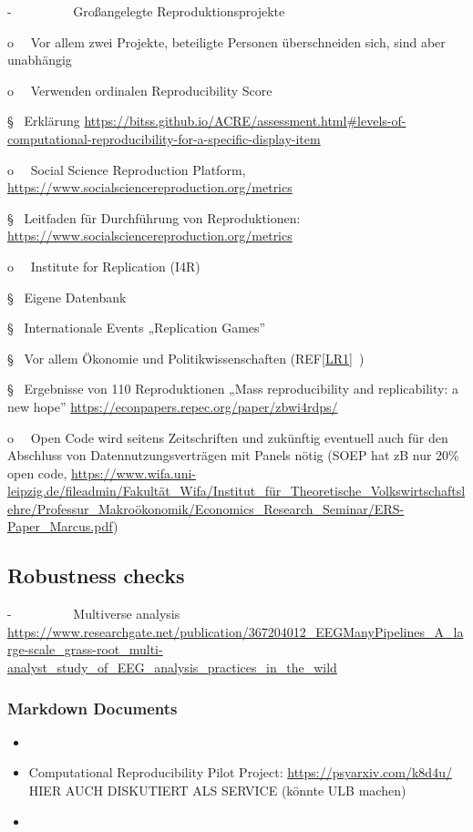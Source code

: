 \documentclass[
  letterpaper,
  DIV=11,
  numbers=noendperiod]{scrreprt}
\begin{document}
-~~~~~~~~~ Großangelegte Reproduktionsprojekte

o~~ Vor allem zwei Projekte, beteiligte Personen überschneiden sich,
sind aber unabhängig

o~~ Verwenden ordinalen Reproducibility Score

§~ Erklärung
\url{https://bitss.github.io/ACRE/assessment.html\#levels-of-computational-reproducibility-for-a-specific-display-item}

o~~ Social Science Reproduction Platform,
\url{https://www.socialsciencereproduction.org/metrics}

§~ Leitfaden für Durchführung von Reproduktionen:
\url{https://www.socialsciencereproduction.org/metrics}

o~~ Institute for Replication (I4R)

§~ Eigene Datenbank

§~ Internationale Events „Replication Games''

§~ Vor allem Ökonomie und Politikwissenschaften
(REF\hyperref[_msocom_1]{{[}LR1{]}}~)

§~ Ergebnisse von 110 Reproduktionen „Mass reproducibility and
replicability: a new hope''
\url{https://econpapers.repec.org/paper/zbwi4rdps/}

o~~ Open Code wird seitens Zeitschriften und zukünftig eventuell auch
für den Abschluss von Datennutzungsverträgen mit Panels nötig (SOEP hat
zB nur 20\% open code,
\url{https://www.wifa.uni-leipzig.de/fileadmin/Fakultät_Wifa/Institut_für_Theoretische_Volkswirtschaftslehre/Professur_Makroökonomik/Economics_Research_Seminar/ERS-Paper_Marcus.pdf})

\subsection{Robustness checks}\label{robustness-checks}

-~~~~~~~~~ Multiverse analysis
\url{https://www.researchgate.net/publication/367204012_EEGManyPipelines_A_large-scale_grass-root_multi-analyst_study_of_EEG_analysis_practices_in_the_wild}

\subsubsection{Markdown Documents}\label{markdown-documents}

\begin{itemize}
\item
\item
  Computational Reproducibility Pilot Project:
  \url{https://psyarxiv.com/k8d4u/} \textbar{} HIER AUCH DISKUTIERT ALS
  SERVICE (könnte ULB machen)
\item
\end{itemize}
\end{document}
